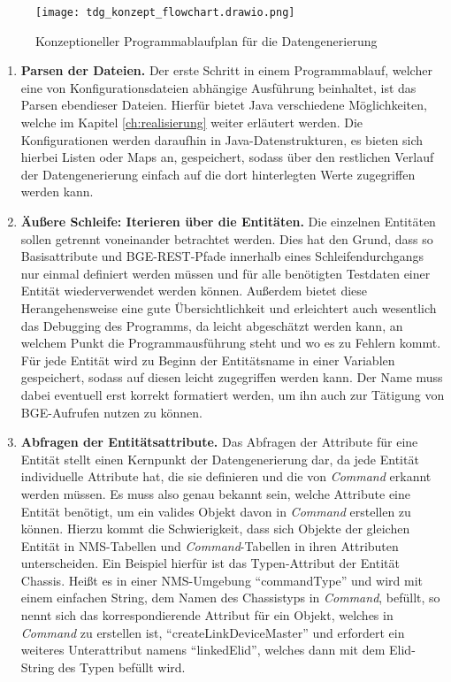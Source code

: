 \begin{figure}[h!]
    \centering
    \texttt{[image: tdg\_konzept\_flowchart.drawio.png]}
    \caption{Konzeptioneller Programmablaufplan für die Datengenerierung}
\end{figure}

\newpage
\begin{enumerate}
    \item \textbf{Parsen der Dateien.} Der erste Schritt in einem Programmablauf, welcher eine von Konfigurationsdateien abhängige Ausführung beinhaltet, ist das Parsen ebendieser Dateien. Hierfür bietet Java verschiedene Möglichkeiten, welche im Kapitel \ref{ch:realisierung} weiter erläutert werden. Die Konfigurationen werden daraufhin in Java-Datenstrukturen, es bieten sich hierbei Listen oder Maps an, gespeichert, sodass über den restlichen Verlauf der Datengenerierung einfach auf die dort hinterlegten Werte zugegriffen werden kann.
    \item \textbf{Äußere Schleife: Iterieren über die Entitäten.} Die einzelnen Entitäten sollen getrennt voneinander betrachtet werden. Dies hat den Grund, dass so Basisattribute und \ac{BGE}-\ac{REST}-Pfade innerhalb eines Schleifendurchgangs nur einmal definiert werden müssen und für alle benötigten Testdaten einer Entität wiederverwendet werden können. Außerdem bietet diese Herangehensweise eine gute Übersichtlichkeit und erleichtert auch wesentlich das Debugging des Programms, da leicht abgeschätzt werden kann, an welchem Punkt die Programmausführung steht und wo es zu Fehlern kommt. Für jede Entität wird zu Beginn der Entitätsname in einer Variablen gespeichert, sodass auf diesen leicht zugegriffen werden kann. Der Name muss dabei eventuell erst korrekt formatiert werden, um ihn auch zur Tätigung von \ac{BGE}-Aufrufen nutzen zu können.
    \item \textbf{Abfragen der Entitätsattribute.} Das Abfragen der Attribute für eine Entität stellt einen Kernpunkt der Datengenerierung dar, da jede Entität individuelle Attribute hat, die sie definieren und die von \textit{Command} erkannt werden müssen. Es muss also genau bekannt sein, welche Attribute eine Entität benötigt, um ein valides Objekt davon in \textit{Command} erstellen zu können. Hierzu kommt die Schwierigkeit, dass sich Objekte der gleichen Entität in \ac{NMS}-Tabellen und \textit{Command}-Tabellen in ihren Attributen unterscheiden. Ein Beispiel hierfür ist das Typen-Attribut der Entität Chassis. Heißt es in einer \ac{NMS}-Umgebung \enquote{commandType} und wird mit einem einfachen String, dem Namen des Chassistyps in \textit{Command}, befüllt, so nennt sich das korrespondierende Attribut für ein Objekt, welches in \textit{Command} zu erstellen ist, \enquote{createLinkDeviceMaster} und erfordert ein weiteres Unterattribut namens \enquote{linkedElid}, welches dann mit dem \ac{Elid}-String des Typen befüllt wird.
    

\end{enumerate}
